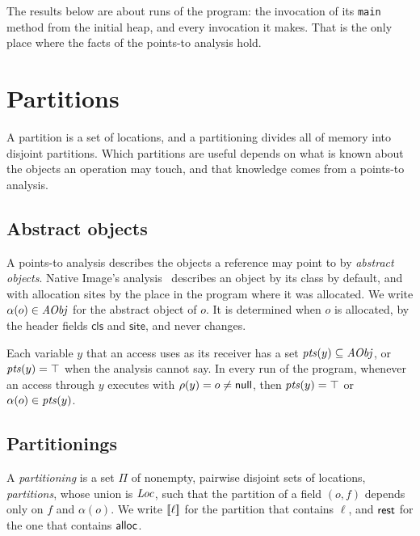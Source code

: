 The results below are about runs of the program: the invocation of its
\texttt{main} method from the initial heap, and every invocation it makes.
That is the only place where the facts of the points-to analysis hold.

\section{Partitions}\label{sec:ee-partitions}

A partition is a set of locations, and a partitioning divides all of memory
into disjoint partitions. Which partitions are useful depends on what is known
about the objects an operation may touch, and that knowledge comes from a
points-to analysis.

\subsection{Abstract objects}

A points-to analysis describes the objects a reference may point to by
\emph{abstract objects}. Native Image's analysis~\cite{wimmer2019initialize}
describes an object by its class by default, and with allocation sites by the
place in the program where it was allocated. We write $\alpha(o) \in \mathit{AObj}$ for
the abstract object of $o$. It is determined when $o$ is allocated, by the
header fields $\mathsf{cls}$ and $\mathsf{site}$, and never changes.

\begin{assumption}\label{as:ee-points-to}
Each variable $y$ that an access uses as its receiver has a set
$\mathit{pts}(y) \subseteq \mathit{AObj}$, or $\mathit{pts}(y) = \top$ when the analysis cannot say.
In every run of the program, whenever an access through $y$ executes with
$\rho(y) = o \neq \mathsf{null}$, then $\mathit{pts}(y) = \top$ or $\alpha(o) \in \mathit{pts}(y)$.
\end{assumption}

\subsection{Partitionings}

\begin{definition}[Partitioning]\label{def:ee-partitioning}
A \emph{partitioning} is a set $\Pi$ of nonempty, pairwise disjoint sets of
locations, \emph{partitions}, whose union is $\mathit{Loc}$, such that the partition of
a field $(o, f)$ depends only on $f$ and $\alpha(o)$. We write $[\![\ell]\!]$ for
the partition that contains $\ell$, and $\mathsf{rest}$ for the one that contains
$\mathsf{alloc}$.
\end{definition}

